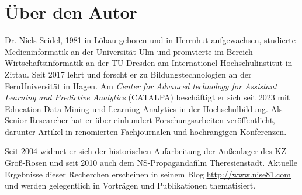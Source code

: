 

\section*{Über den Autor}
Dr. Niels Seidel, 1981 in Löbau geboren und in Herrnhut aufgewachsen, studierte Medieninformatik an der Universität Ulm und promvierte im Bereich Wirtschaftsinformatik an der TU Dresden am Internationel Hochschulinstitut in Zittau. Seit 2017 lehrt und forscht er zu Bildungstechnologien an der FernUniversität in Hagen. Am \textit{Center for Advanced technology for Assistant Learning and Predictive Analytics} (CATALPA) beschäftigt er sich seit 2023 mit Education Data Mining und Learning Analytics in der Hochschulbildung. Als Senior Researcher hat er über einhundert Forschungsarbeiten veröffentlicht, darunter Artikel in renomierten Fachjournalen und hochrangigen Konferenzen.

Seit 2004 widmet er sich der historischen Aufarbeitung der Außenlager des KZ Groß-Rosen und seit 2010 auch dem NS-Propagandafilm Theresienstadt. Aktuelle Ergebnisse dieser Recherchen erscheinen in seinem Blog \url{http://www.nise81.com} und werden gelegentlich in Vorträgen und Publikationen thematisiert.
